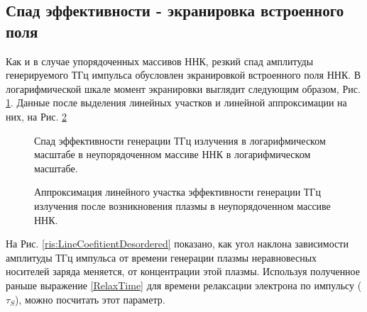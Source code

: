 \documentclass[a4paper,14pt,russian]{extreport}
\begin{document}
			\subsection{Спад эффективности - экранировка встроенного поля}
				Как и в случае упорядоченных массивов ННК, резкий спад амплитуды генерируемого ТГц импульса обусловлен экранировкой встроенного поля ННК. В логарифмической шкале момент экранировки выглядит следующим образом, Рис. \ref{ris:LogDesorderShort}. Данные после выделения линейных участков и линейной аппроксимации на них, на Рис. \ref{ris:linearDesorder}
				\begin{figure}[H]
					\caption{Спад эффективности генерации ТГц излучения в логарифмическом масштабе в неупорядоченном массиве ННК в логарифмическом масштабе.}
				\label{ris:LogDesorderShort}
				\end{figure}
				\begin{figure}[h]
					\caption{Аппроксимация линейного участка эффективности генерации ТГц излучения после возникновения плазмы в неупорядоченном массиве ННК.}
				\label{ris:linearDesorder}
				\end{figure}
				На Рис. \ref{ris:LineCoefitientDesordered} показано, как угол наклона зависимости амплитуды ТГц импульса от времени генерации плазмы неравновесных носителей заряда меняется, от концентрации этой плазмы. Используя полученное раньше выражение \ref{RelaxTime} для времени релаксации электрона по импульсу ($\tau_{S}$), можно посчитать этот параметр.\par
\end{document}
